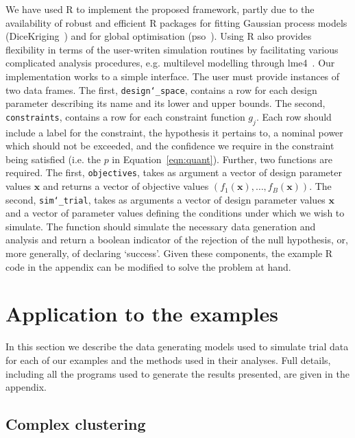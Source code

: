 \documentclass{article} %
\begin{document}
We have used R to implement the proposed framework, partly due to the availability of robust and efficient R packages for fitting Gaussian process models (DiceKriging~\cite{Roustant2012}) and for global optimisation (pso~\cite{Bendtsen2012}). Using R also provides flexibility in terms of the user-writen simulation routines by facilitating various complicated analysis procedures, e.g. multilevel modelling through lme4~\cite{Bates2015}. Our implementation works to a simple interface. The user must provide instances of two data frames. The first, \texttt{design\char`_space}, contains a row for each design parameter describing its name and its lower and upper bounds. The second, \texttt{constraints}, contains a row for each constraint function $g_{j}$. Each row should include a label for the constraint, the hypothesis it pertains to, a nominal power which should not be exceeded, and the confidence we require in the constraint being satisfied (i.e. the $p$ in Equation~\ref{eqn:quant}). Further, two functions are required. The first, \texttt{objectives}, takes as argument a vector of design parameter values $\mathbf{x}$ and returns a vector of objective values $( f_{1}(\mathbf{x}), \ldots, f_{B}(\mathbf{x}) )$. The second, \texttt{sim\char`_trial}, takes as arguments a vector of design parameter values $\mathbf{x}$ and a vector of parameter values defining the conditions under which we wish to simulate. The function should simulate the necessary data generation and analysis and return a boolean indicator of the rejection of the null hypothesis, or, more generally, of declaring `success'. Given these components, the example R code in the appendix can be modified to solve the problem at hand.

\section{Application to the examples}\label{sec:application}

In this section we describe the data generating models used to simulate trial data for each of our examples and the methods used in their analyses. Full details, including all the programs used to generate the results presented, are given in the appendix.

\subsection{Complex clustering}
\end{document}
